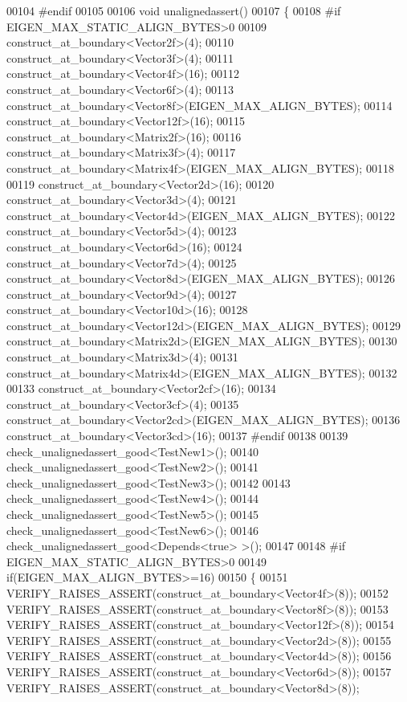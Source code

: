 \begin{DoxyCode}
00104 \textcolor{preprocessor}{#endif}
00105 
00106 \textcolor{keywordtype}{void} unalignedassert()
00107 \{
00108 \textcolor{preprocessor}{#if EIGEN\_MAX\_STATIC\_ALIGN\_BYTES>0}
00109   construct\_at\_boundary<Vector2f>(4);
00110   construct\_at\_boundary<Vector3f>(4);
00111   construct\_at\_boundary<Vector4f>(16);
00112   construct\_at\_boundary<Vector6f>(4);
00113   construct\_at\_boundary<Vector8f>(EIGEN\_MAX\_ALIGN\_BYTES);
00114   construct\_at\_boundary<Vector12f>(16);
00115   construct\_at\_boundary<Matrix2f>(16);
00116   construct\_at\_boundary<Matrix3f>(4);
00117   construct\_at\_boundary<Matrix4f>(EIGEN\_MAX\_ALIGN\_BYTES);
00118 
00119   construct\_at\_boundary<Vector2d>(16);
00120   construct\_at\_boundary<Vector3d>(4);
00121   construct\_at\_boundary<Vector4d>(EIGEN\_MAX\_ALIGN\_BYTES);
00122   construct\_at\_boundary<Vector5d>(4);
00123   construct\_at\_boundary<Vector6d>(16);
00124   construct\_at\_boundary<Vector7d>(4);
00125   construct\_at\_boundary<Vector8d>(EIGEN\_MAX\_ALIGN\_BYTES);
00126   construct\_at\_boundary<Vector9d>(4);
00127   construct\_at\_boundary<Vector10d>(16);
00128   construct\_at\_boundary<Vector12d>(EIGEN\_MAX\_ALIGN\_BYTES);
00129   construct\_at\_boundary<Matrix2d>(EIGEN\_MAX\_ALIGN\_BYTES);
00130   construct\_at\_boundary<Matrix3d>(4);
00131   construct\_at\_boundary<Matrix4d>(EIGEN\_MAX\_ALIGN\_BYTES);
00132 
00133   construct\_at\_boundary<Vector2cf>(16);
00134   construct\_at\_boundary<Vector3cf>(4);
00135   construct\_at\_boundary<Vector2cd>(EIGEN\_MAX\_ALIGN\_BYTES);
00136   construct\_at\_boundary<Vector3cd>(16);
00137 \textcolor{preprocessor}{#endif}
00138 
00139   check\_unalignedassert\_good<TestNew1>();
00140   check\_unalignedassert\_good<TestNew2>();
00141   check\_unalignedassert\_good<TestNew3>();
00142 
00143   check\_unalignedassert\_good<TestNew4>();
00144   check\_unalignedassert\_good<TestNew5>();
00145   check\_unalignedassert\_good<TestNew6>();
00146   check\_unalignedassert\_good<Depends<true> >();
00147 
00148 \textcolor{preprocessor}{#if EIGEN\_MAX\_STATIC\_ALIGN\_BYTES>0}
00149   \textcolor{keywordflow}{if}(EIGEN\_MAX\_ALIGN\_BYTES>=16)
00150   \{
00151     VERIFY\_RAISES\_ASSERT(construct\_at\_boundary<Vector4f>(8));
00152     VERIFY\_RAISES\_ASSERT(construct\_at\_boundary<Vector8f>(8));
00153     VERIFY\_RAISES\_ASSERT(construct\_at\_boundary<Vector12f>(8));
00154     VERIFY\_RAISES\_ASSERT(construct\_at\_boundary<Vector2d>(8));
00155     VERIFY\_RAISES\_ASSERT(construct\_at\_boundary<Vector4d>(8));
00156     VERIFY\_RAISES\_ASSERT(construct\_at\_boundary<Vector6d>(8));
00157     VERIFY\_RAISES\_ASSERT(construct\_at\_boundary<Vector8d>(8));

\end{DoxyCode}
